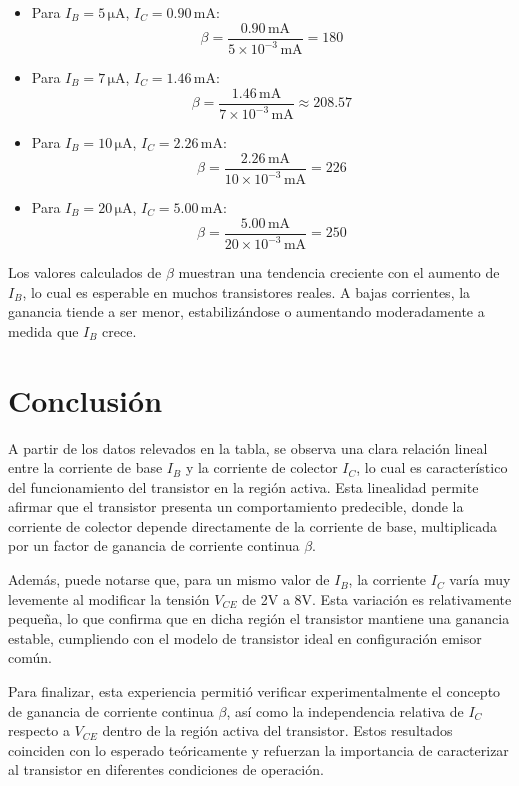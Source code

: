\begin{itemize}
    \item Para $I_B = 5\,\si{\micro\ampere}$, $I_C = 0.90\,\si{\milli\ampere}$:
    \[
    \beta = \frac{0.90\,\si{\milli\ampere}}{5 \times 10^{-3}\,\si{\milli\ampere}} = 180
    \]

    \item Para $I_B = 7\,\si{\micro\ampere}$, $I_C = 1.46\,\si{\milli\ampere}$:
    \[
    \beta = \frac{1.46\,\si{\milli\ampere}}{7 \times 10^{-3}\,\si{\milli\ampere}} \approx 208.57
    \]

    \item Para $I_B = 10\,\si{\micro\ampere}$, $I_C = 2.26\,\si{\milli\ampere}$:
    \[
    \beta = \frac{2.26\,\si{\milli\ampere}}{10 \times 10^{-3}\,\si{\milli\ampere}} = 226
    \]

    \item Para $I_B = 20\,\si{\micro\ampere}$, $I_C = 5.00\,\si{\milli\ampere}$:
    \[
    \beta = \frac{5.00\,\si{\milli\ampere}}{20 \times 10^{-3}\,\si{\milli\ampere}} = 250
    \]
\end{itemize}

\noindent
Los valores calculados de $\beta$ muestran una tendencia creciente con el aumento de $I_B$, lo cual es esperable en muchos transistores reales. A bajas corrientes, la ganancia tiende a ser menor, estabilizándose o aumentando moderadamente a medida que $I_B$ crece.




\section{Conclusión}

A partir de los datos relevados en la tabla, se observa una clara relación lineal entre la corriente de base $I_B$ y la corriente de colector $I_C$, lo cual es característico del funcionamiento del transistor en la región activa. Esta linealidad permite afirmar que el transistor presenta un comportamiento predecible, donde la corriente de colector depende directamente de la corriente de base, multiplicada por un factor de ganancia de corriente continua $\beta$.

Además, puede notarse que, para un mismo valor de $I_B$, la corriente $I_C$ varía muy levemente al modificar la tensión $V_{CE}$ de 2V a 8V. Esta variación es relativamente pequeña, lo que confirma que en dicha región el transistor mantiene una ganancia estable, cumpliendo con el modelo de transistor ideal en configuración emisor común.

Para finalizar, esta experiencia permitió verificar experimentalmente el concepto de ganancia de corriente continua $\beta$, así como la independencia relativa de $I_C$ respecto a $V_{CE}$ dentro de la región activa del transistor. Estos resultados coinciden con lo esperado teóricamente y refuerzan la importancia de caracterizar al transistor en diferentes condiciones de operación.

\newpage
